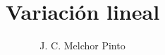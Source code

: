 \documentclass[12pt]{guia}
\title{Variación lineal}
\author{J. C. Melchor Pinto}
\begin{document}
\pagestyle{headandfoot}
\addpoints
\INFO

\begin{questions}
    
    \newpage
    
\end{questions}
\end{document}
